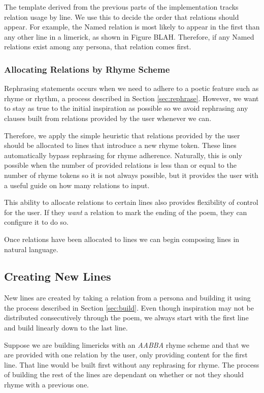 The template derived from the previous parts of the implementation tracks relation usage by line. We use this to decide the order that relations should appear. For example, the Named relation is most likely to appear in the first than any other line in a limerick, as shown in Figure BLAH. Therefore, if any Named relations exist among any persona, that relation comes first.

\subsubsection{Allocating Relations by Rhyme Scheme}

Rephrasing statements occurs when we need to adhere to a poetic feature such as rhyme or rhythm, a process described in Section \ref{sec:rephrase}. However, we want to stay as true to the initial inspiration as possible so we avoid rephrasing any clauses built from relations provided by the user whenever we can.

Therefore, we apply the simple heuristic that relations provided by the user should be allocated to lines that introduce a new rhyme token. These lines automatically bypass rephrasing for rhyme adherence. Naturally, this is only possible when the number of provided relations is less than or equal to the number of rhyme tokens so it is not always possible, but it provides the user with a useful guide on how many relations to input.

This ability to allocate relations to certain lines also provides flexibility of control for the user. If they \textit{want} a relation to mark the ending of the poem, they can configure it to do so.

Once relations have been allocated to lines we can begin composing lines in natural language.

\subsection{Creating New Lines}
\label{sec:new-lines}
New lines are created by taking a relation from a persona and building it using the process described in Section \ref{sec:build}. Even though inspiration may not be distributed consecutively through the poem, we always start with the first line and build linearly down to the last line.

Suppose we are building limericks with an \textit{AABBA} rhyme scheme and that we are provided with one relation by the user, only providing content for the first line. That line would be built first without any rephrasing for rhyme. The process of building the rest of the lines are dependant on whether or not they should rhyme with a previous one.

